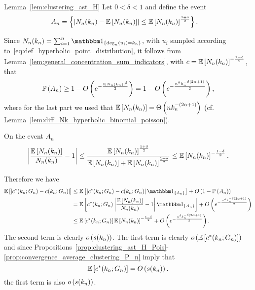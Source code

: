 \begin{proofof}{Lemma~\ref{lem:clustering_ast_H}}
Let $0 < \delta < 1$ and define the event
\begin{align*}
	A_n &= \left\{\left|N_n(k_n) - \mathbb{E}\left[N_n(k_n)\right]\right| \le \mathbb{E}\left[N_n(k_n)\right]^{\frac{1 + \delta}{2}}\right\}.
\end{align*}

Since $N_n(k_n) = \sum_{i = 1}^n \ind{\mathrm{deg}_n(u_i) = k_n}$, with $u_i$ sampled according to~\eqref{eq:def_hyperbolic_point_distribution}, it follows from Lemma~\ref{lem:general_concentration_sum_indicators}, with $c = \mathbb{E}\left[N_{n}(k_n)\right]^{-\frac{1-\delta}{2}}$, that
\begin{equation}\label{eq:clustering_ast_H_prob_A}
	\mathbb{P}\left(A_n\right) \ge 1 - O\left(e^{-\frac{\mathbb{E}\left[N_{n}(k_n)\right]^\delta}{2}}\right) = 1 - O\left(e^{-\frac{n^\delta k_n^{-\delta(2\alpha + 1)}}{2}}\right),
\end{equation}
where for the last part we used that $\mathbb{E}\left[N_n(k_n)\right] = \Theta\left(n k_n^{-(2\alpha + 1)}\right)$ (cf. Lemma~\ref{lem:diff_Nk_hyperbolic_binomial_poisson}).

On the event $A_n$
\[
	\left|\frac{\mathbb{E}\left[N_{n}(k_n)\right]}{N_{n}(k_n)} - 1\right| 
	\le \frac{\mathbb{E}\left[N_{n}(k_n)\right]^{\frac{1 + \delta}{2}}}{\mathbb{E}\left[N_{n}(k_n)\right]+\mathbb{E}\left[N_{n}(k_n)\right]^{\frac{1 + \delta}{2}}}
	\le \mathbb{E}\left[N_{n}(k_n)\right]^{-\frac{1 - \delta}{2}}.
\]

Therefore we have
\begin{align*}
	\Exp{\left|c^\ast(k_n; G_n) - c(k_n; G_n)\right|}
	&\le \Exp{\left|c^\ast(k_n; G_n) - c(k_n; G_n)\right|\ind{A_n}} + \bigO{1 - \Prob{A_n}}\\
	&= \Exp{c^\ast(k_n; G_n)\left|\frac{\Exp{N_{n}(k_n)}}{N_{n}(k_n)} - 1\right|\ind{A_n}}
		+ \bigO{e^{-\frac{n^\delta k_n^{-\delta(2\alpha + 1)}}{2}}}\\
	&\le \Exp{c^\ast(k_n; G_n)}\Exp{N_{n}(k_n)}^{-\frac{1 - \delta}{2}} 
		+ \bigO{e^{-\frac{n^\delta k_n^{-\delta(2\alpha + 1)}}{2}}}.
\end{align*}
The second term is clearly $o\left(s(k_n)\right)$. The first term is clearly $o\left(\mathbb{E}\left[c^\ast(k_n; G_n)\right]\right)$ and since Propositions~\ref{prop:clustering_ast_H_Pois}-\ref{prop:convergence_average_clustering_P_n} imply that
\[
	\mathbb{E}\left[c^\ast(k_n; G_n)\right] = O\left(s(k_n)\right).
\] 
the first term is also $o\left(s(k_n)\right)$.
\end{proofof}









